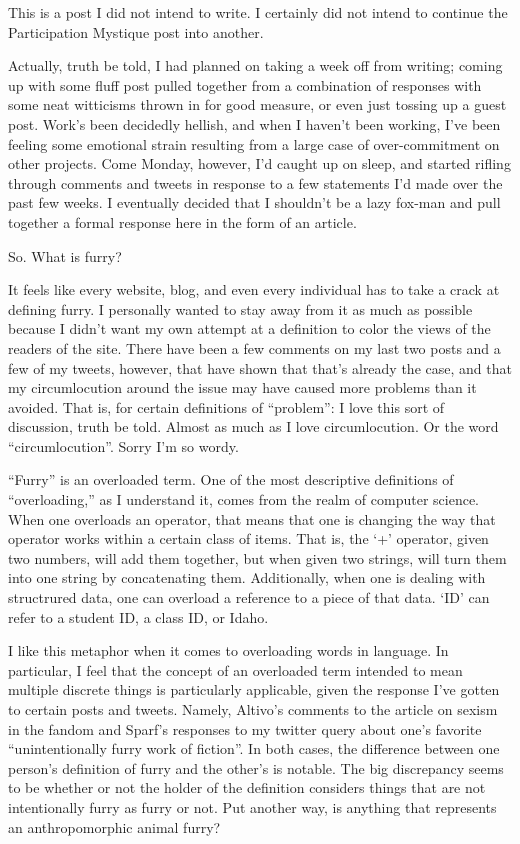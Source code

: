 
This is a post I did not intend to write.  I certainly did not intend to continue the Participation Mystique post into another.

Actually, truth be told, I had planned on taking a week off from writing; coming up with some fluff post pulled together from a combination of responses with some neat witticisms thrown in for good measure, or even just tossing up a guest post.  Work's been decidedly hellish, and when I haven't been working, I've been feeling some emotional strain resulting from a large case of over-commitment on other projects.  Come Monday, however, I'd caught up on sleep, and started rifling through comments and tweets in response to a few statements I'd made over the past few weeks.  I eventually decided that I shouldn't be a lazy fox-man and pull together a formal response here in the form of an article.

So.  What is furry?

It feels like every website, blog, and even every individual has to take a crack at defining furry.  I personally wanted to stay away from it as much as possible because I didn't want my own attempt at a definition to color the views of the readers of the site.  There have been a few comments on my last two posts and a few of my tweets, however, that have shown that that's already the case, and that my circumlocution around the issue may have caused more problems than it avoided.  That is, for certain definitions of ``problem'': I love this sort of discussion, truth be told.  Almost as much as I love circumlocution.  Or the word ``circumlocution''.  Sorry I'm so wordy.

``Furry'' is an overloaded term.  One of the most descriptive definitions of ``overloading,'' as I understand it, comes from the realm of computer science.  When one overloads an operator, that means that one is changing the way that operator works within a certain class of items.  That is, the `+' operator, given two numbers, will add them together, but when given two strings, will turn them into one string by concatenating them.  Additionally, when one is dealing with structrured data, one can overload a reference to a piece of that data.  `ID' can refer to a student ID, a class ID, or Idaho.

I like this metaphor when it comes to overloading words in language.  In particular, I feel that the concept of an overloaded term intended to mean multiple discrete things is  particularly applicable, given the response I've gotten to certain posts and tweets.  Namely, Altivo's comments to the article on sexism in the fandom and Sparf's responses to my twitter query about one's favorite ``unintentionally furry work of fiction''.  In both cases, the difference between one person's definition of furry and the other's is notable.  The big discrepancy seems to be whether or not the holder of the definition considers things that are not intentionally furry as furry or not.  Put another way, is anything that represents an anthropomorphic animal furry?

